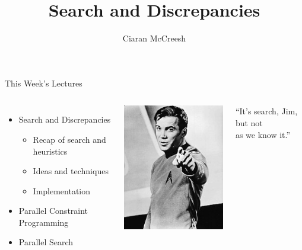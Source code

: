 \documentclass{beamer}
\title{Search and Discrepancies}
\author[Ciaran McCreesh]{\textcolor{uofgblue}{Ciaran McCreesh}}
\begin{document}
{
    \begin{frame}
        \titlepage
    \end{frame}
}

\begin{frame}{This Week's Lectures}
    \begin{columns}
        \begin{itemize}
            \item \textcolor{uofgblue}{Search and Discrepancies}
                \begin{itemize}
                    \item Recap of search and heuristics
                    \item Ideas and techniques
                    \item Implementation
                \end{itemize}
            \item Parallel Constraint Programming
            \item Parallel Search
        \end{itemize}
        \centering\includegraphics*[keepaspectratio=true,scale=0.5]{images/search-but-not-as-we-know-it.jpg}
        \begin{center}``It's search, Jim, but not\\as we know it.''\end{center}
    \end{columns}
\end{frame}
\end{document}
